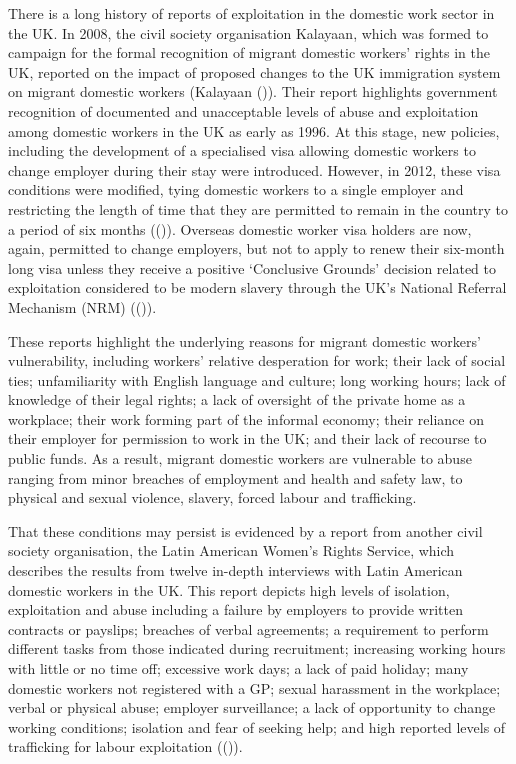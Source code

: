 \documentclass[
  12pt,
]{article}
\theoremstyle{plain}
\theoremstyle{definition}
\begin{document}
There is a long history of reports of exploitation in the domestic work
sector in the UK. In 2008, the civil society organisation Kalayaan,
which was formed to campaign for the formal recognition of migrant
domestic workers' rights in the UK, reported on the impact of proposed
changes to the UK immigration system on migrant domestic workers
(Kalayaan ()). Their report
highlights government recognition of documented and unacceptable levels
of abuse and exploitation among domestic workers in the UK as early as
1996. At this stage, new policies, including the development of a
specialised visa allowing domestic workers to change employer during
their stay were introduced. However, in 2012, these visa conditions were
modified, tying domestic workers to a single employer and restricting
the length of time that they are permitted to remain in the country to a
period of six months
(()).
Overseas domestic worker visa holders are now, again, permitted to
change employers, but not to apply to renew their six-month long visa
unless they receive a positive `Conclusive Grounds' decision related to
exploitation considered to be modern slavery through the UK's National
Referral Mechanism (NRM)
(()).

These reports highlight the underlying reasons for migrant domestic
workers' vulnerability, including workers' relative desperation for
work; their lack of social ties; unfamiliarity with English language and
culture; long working hours; lack of knowledge of their legal rights; a
lack of oversight of the private home as a workplace; their work forming
part of the informal economy; their reliance on their employer for
permission to work in the UK; and their lack of recourse to public
funds. As a result, migrant domestic workers are vulnerable to abuse
ranging from minor breaches of employment and health and safety law, to
physical and sexual violence, slavery, forced labour and trafficking.

That these conditions may persist is evidenced by a report from another
civil society organisation, the Latin American Women's Rights Service,
which describes the results from twelve in-depth interviews with Latin
American domestic workers in the UK. This report depicts high levels of
isolation, exploitation and abuse including a failure by employers to
provide written contracts or payslips; breaches of verbal agreements; a
requirement to perform different tasks from those indicated during
recruitment; increasing working hours with little or no time off;
excessive work days; a lack of paid holiday; many domestic workers not
registered with a GP; sexual harassment in the workplace; verbal or
physical abuse; employer surveillance; a lack of opportunity to change
working conditions; isolation and fear of seeking help; and high
reported levels of trafficking for labour exploitation
(()).
\end{document}
